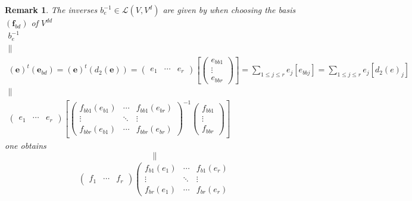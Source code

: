 \documentclass[aps,preprint]{revtex4}
\newtheorem{remark}[theorem]{Remark}
\begin{document}
\begin{remark}
The inverses $b_{e}^{-1}\in \mathcal{L}\left( V,V^{d}\right) $ are given by
when choosing the basis $\left( \boldsymbol{f}_{bd}\right) $ of $V^{dd}$ 
\begin{gather}
b_{e}^{-1} \\
\parallel \\
\left( \boldsymbol{e}\right) ^{t}\left( \boldsymbol{e}_{bd}\right) =\left( 
\boldsymbol{e}\right) ^{t}\left( d_{2}\left( \boldsymbol{e}\right) \right)
=\left( 
\begin{array}{ccc}
e_{1} & \cdots & e_{r}%
\end{array}%
\right) \left[ \left( 
\begin{array}{c}
e_{bb1} \\ 
\vdots \\ 
e_{bbr}%
\end{array}%
\right) \right] =\sum_{1\leq j\leq r}e_{j}\left[ e_{bbj}\right] =\sum_{1\leq
j\leq r}e_{j}\left[ d_{2}\left( e\right) _{j}\right] \\
\parallel \\
\left( 
\begin{array}{ccc}
e_{1} & \cdots & e_{r}%
\end{array}%
\right) \left[ \left( 
\begin{array}{ccc}
f_{bb1}\left( e_{b1}\right) & \cdots & f_{bb1}\left( e_{br}\right) \\ 
\vdots & \ddots & \vdots \\ 
f_{bbr}\left( e_{b1}\right) & \cdots & f_{bbr}\left( e_{br}\right)%
\end{array}%
\right) ^{-1}\left( 
\begin{array}{c}
f_{bb1} \\ 
\vdots \\ 
f_{bbr}%
\end{array}%
\right) \right]
\end{gather}%
one obtains 
\begin{equation}
\parallel
\end{equation}%
\begin{gather}
\left( 
\begin{array}{ccc}
f_{1} & \cdots & f_{r}%
\end{array}%
\right) \left( 
\begin{array}{ccc}
f_{b1}\left( e_{1}\right) & \cdots & f_{b1}\left( e_{r}\right) \\ 
\vdots & \ddots & \vdots \\ 
f_{br}\left( e_{1}\right) & \cdots & f_{br}\left( e_{r}\right)%

\end{array}
\end{gather}
\end{remark}
\end{document}
